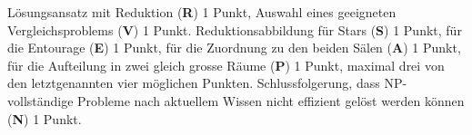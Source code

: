 \begin{bewertung}
Lösungsansatz mit Reduktion ({\bf R}) 1 Punkt,
Auswahl eines geeigneten Vergleichsproblems ({\bf V}) 1 Punkt.
Reduktionsabbildung für Stars ({\bf S}) 1 Punkt,
für die Entourage ({\bf E}) 1 Punkt,
für die Zuordnung zu den beiden Sälen ({\bf A}) 1 Punkt,
für die Aufteilung in zwei gleich grosse Räume ({\bf P}) 1 Punkt,
maximal drei von den letztgenannten vier möglichen Punkten.
Schlussfolgerung, dass NP-vollständige Probleme nach aktuellem
Wissen nicht effizient gelöst werden können ({\bf N}) 1 Punkt.
\end{bewertung}
